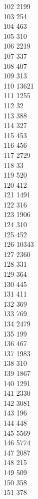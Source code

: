 { 102	2199 \\
 103	254 \\
 104	463 \\
 105	310 \\
 106	2219 \\
 107	337 \\
 108	407 \\
 109	313 \\
 110	13621 \\
 111	1255 \\
 112	32 \\
 113	388 \\
 114	327 \\
 115	453 \\
 116	456 \\
 117	2729 \\
 118	33 \\
 119	520 \\
 120	412 \\
 121	1491 \\
 122	316 \\
 123	1906 \\
 124	310 \\
 125	452 \\
 126	10343 \\
 127	2360 \\
 128	331 \\
 129	364 \\
 130	445 \\
 131	411 \\
 132	369 \\
 133	769 \\
 134	2479 \\
 135	199 \\
 136	467 \\
 137	1983 \\
 138	310 \\
 139	1867 \\
 140	1291 \\
 141	2330 \\
 142	3081 \\
 143	196 \\
 144	448 \\
 145	5569 \\
 146	5774 \\
 147	2087 \\
 148	215 \\
 149	509 \\
 150	358 \\
 151	378 \\
}
